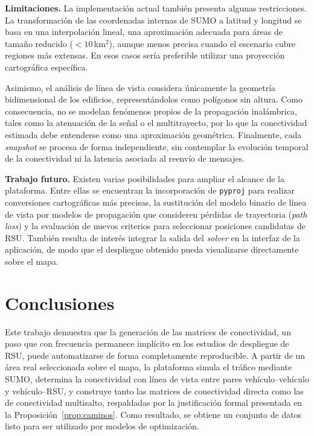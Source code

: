 \documentclass[smartcities,article,submit,oneauthor]{Definitions/mdpi}
\begin{document}
\textbf{Limitaciones.} La implementación actual también presenta algunas
restricciones. La transformación de las coordenadas internas de SUMO a latitud y
longitud se basa en una interpolación lineal, una aproximación adecuada para áreas
de tamaño reducido ($<10$\,km$^2$), aunque menos precisa cuando el escenario cubre
regiones más extensas. En esos casos sería preferible utilizar una proyección
cartográfica específica.

Asimismo, el análisis de línea de vista considera únicamente la geometría
bidimensional de los edificios, representándolos como polígonos sin altura. Como
consecuencia, no se modelan fenómenos propios de la propagación inalámbrica, tales
como la atenuación de la señal o el multitrayecto, por lo que la conectividad
estimada debe entenderse como una aproximación geométrica. Finalmente, cada
\emph{snapshot} se procesa de forma independiente, sin contemplar la evolución
temporal de la conectividad ni la latencia asociada al reenvío de mensajes.

\textbf{Trabajo futuro.} Existen varias posibilidades para ampliar el alcance de la
plataforma. Entre ellas se encuentran la incorporación de \texttt{pyproj} para
realizar conversiones cartográficas más precisas, la sustitución del modelo binario
de línea de vista por modelos de propagación que consideren pérdidas de trayectoria
(\emph{path loss}) y la evaluación de nuevos criterios para seleccionar posiciones
candidatas de RSU. También resulta de interés integrar la salida del
\emph{solver} en la interfaz de la aplicación, de modo que el despliegue obtenido
pueda visualizarse directamente sobre el mapa.

\section{Conclusiones}

Este trabajo demuestra que la generación de las matrices de conectividad, un paso que
con frecuencia permanece implícito en los estudios de despliegue de RSU, puede
automatizarse de forma completamente reproducible. A partir de un área real
seleccionada sobre el mapa, la plataforma simula el tráfico mediante SUMO, determina
la conectividad con línea de vista entre pares vehículo--vehículo y
vehículo--RSU, y construye tanto las matrices de conectividad directa como las de
conectividad multisalto, respaldadas por la justificación formal presentada en la
Proposición~\ref{prop:caminos}. Como resultado, se obtiene un conjunto de datos listo
para ser utilizado por modelos de optimización.
\end{document}
